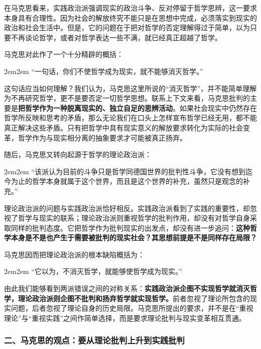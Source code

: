 \documentclass[a4paper,twoside,12pt,AutoFakeBold]{ctexart}
\begin{document}
在马克思看来，实践政治派强调现实的政治斗争、反对停留于哲学思辨，这一要求本身具有合理性。因为社会的解放终究不能只是在思想中完成，必须落实到现实的政治和社会生活中。但是，它的问题在于把对哲学的否定理解得过于简单，以为只要不再谈论哲学，或者对哲学表达一些不满，就已经真正超越了哲学。

马克思对此作了一个十分精辟的概括：

\begin{adjustwidth}{2em}{2em}
\qquad\fangsong
“一句话，你们不使哲学成为现实，就不能够消灭哲学。”
\end{adjustwidth}

这句话应当如何理解？我们认为，马克思这里所说的“消灭哲学”，并不能简单理解为不再研究哲学，更不是要否定一切哲学思想。联系上下文来看，马克思批判的主要是\textbf{把哲学作为一种脱离现实的、独立自足的思辨活动}。如果社会现实中仍然存在哲学所反映和思考的矛盾，那么无论我们在口头上怎样宣布哲学已经无用，都不能真正解决这些矛盾。只有把哲学中具有现实意义的解放要求转化为实际的社会变革，哲学作为与现实相分离的抽象要求才可能被真正扬弃。

随后，马克思又转向起源于哲学的理论政治派：

\begin{adjustwidth}{2em}{2em}
\qquad\fangsong
“该派认为目前的斗争只是哲学同德国世界的批判性斗争，它没有想到迄今为止的哲学本身就属于这个世界，而且是这个世界的补充，虽然只是观念的补充。”
\end{adjustwidth}

理论政治派的问题与实践政治派恰好相反。实践政治派看到了实践的重要性，却忽视了哲学与现实的联系；理论政治派则重视哲学的批判作用，却没有对哲学自身采取同样的批判态度。它把哲学作为批判现实的出发点，却没有进一步追问：\textbf{这种哲学本身是不是也产生于需要被批判的现实社会？其思想前提是不是同样存在局限？}

马克思因而把理论政治派的根本缺陷概括为：

\begin{adjustwidth}{2em}{2em}
\qquad\fangsong
“它以为，不消灭哲学，就能够使哲学成为现实。”
\end{adjustwidth}

由此我们能够看到两派错误之间的对称关系：\textbf{实践政治派企图不实现哲学就消灭哲学，理论政治派则企图不批判和扬弃哲学就实现哲学。}前者忽视了理论所包含的现实问题，后者忽视了理论自身的历史局限。马克思所提出的要求，并不是在“重视理论”与“重视实践”之间作简单选择，而是要求理论批判与现实变革相互贯通。


\subsubsection{二、马克思的观点：要从理论批判上升到实践批判}
\end{document}
